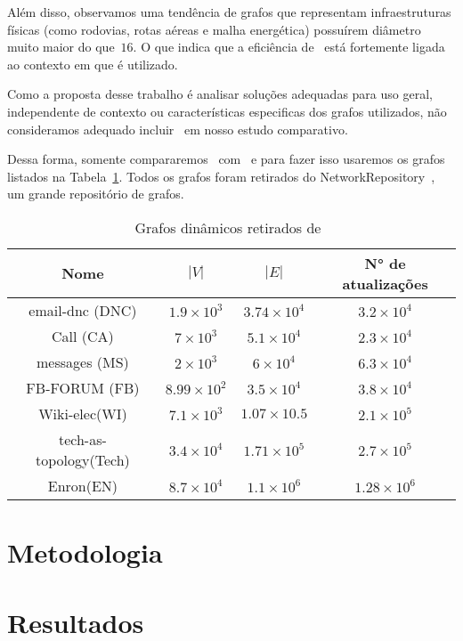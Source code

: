 Além disso, observamos uma tendência de grafos que representam infraestruturas físicas (como rodovias, rotas aéreas e malha energética) possuírem diâmetro muito maior do que~$16$.
O que indica que a eficiência de~\CLHB{} está fortemente ligada ao contexto em que é utilizado. 

Como a proposta desse trabalho é analisar soluções adequadas para uso geral, independente de contexto ou características especificas dos grafos utilizados, não consideramos adequado incluir~\CLHB{} em nosso estudo comparativo.


Dessa forma, somente compararemos~\HK{} com~\HDT{} e para fazer isso usaremos os grafos listados na Tabela~\ref{tab:datasets}.
Todos os grafos foram retirados do NetworkRepository~\cite{nr-aaai15}, um grande repositório de grafos.


\begin{table}
\begin{center}
\begin{tabular}{ |c|c|c|c| } 
 \hline
	Nome & $|V|$ & $|E|$ & N° de atualizações\\
 \hline
	email-dnc (DNC)&$1.9\times 10^3$&$3.74\times 10^4$&$3.2\times 10^4$\\
 \hline
	Call (CA)&$7\times 10^3$&$5.1\times 10^4$&$2.3\times 10^4$\\
 \hline
	messages (MS)&$2\times 10^3$&$6\times 10^4$&$6.3\times 10^4$\\
 \hline
	FB-FORUM (FB)&$8.99\times 10^2$&$3.5\times 10^4$&$3.8\times 10^4$\\
 \hline
	Wiki-elec(WI)&$7.1\times 10^3$&$1.07\times 10.5$&$2.1\times 10^5$\\
 \hline
	tech-as-topology(Tech)&$3.4\times 10^4$&$1.71\times 10^5$&$2.7\times 10^5$\\
 \hline
	Enron(EN)&$8.7\times 10^4$&$1.1\times 10^6$&$1.28\times 10^6$\\
 \hline
\end{tabular}
\caption{Grafos dinâmicos retirados de~\cite{nr-aaai15}}
\label{tab:datasets}
\end{center}
\end{table}


\section{Metodologia}

\cite{guideXP1999}

\section{Resultados}


